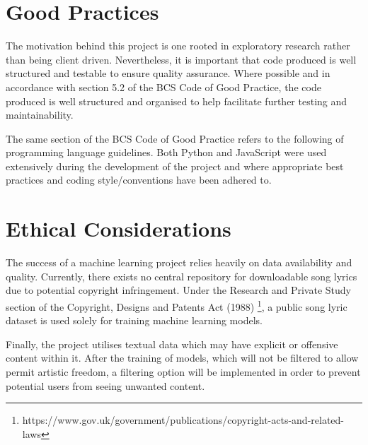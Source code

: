 \section{Good Practices}
The motivation behind this project is one rooted in exploratory research rather than being client driven. Nevertheless, it is important that code produced is well structured and testable to ensure quality assurance. Where possible and in accordance with section 5.2 of the BCS Code of Good Practice, the code produced is well structured and organised to help facilitate further testing and maintainability. 

\noindent
\newline
The same section of the BCS Code of Good Practice refers to the following of programming language guidelines. Both Python and JavaScript were used extensively during the development of the project and where appropriate best practices and coding style/conventions have been adhered to. 

\section{Ethical Considerations}
The success of a machine learning project relies heavily on data availability and quality. Currently, there exists no central repository for downloadable song lyrics due to potential copyright infringement. Under the Research and Private Study section of the Copyright, Designs and Patents Act (1988) \footnote{https://www.gov.uk/government/publications/copyright-acts-and-related-laws}, a public song lyric dataset is used solely for training machine learning models. 

\noindent
\newline
Finally, the project utilises textual data which may have explicit or offensive content within it. After the training of models, which will not be filtered to allow permit artistic freedom, a filtering option will be implemented in order to prevent potential users from seeing unwanted content.